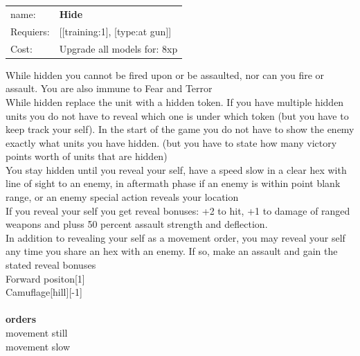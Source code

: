 \ \\
\ \\
\begin{tabular}{ll}
name: & {\bf Hide } \\
Requiers: & [[training:1], [type:at gun]] \\
Cost: & Upgrade all models for: 8xp \\
\end{tabular}

While hidden you cannot be fired upon or be assaulted, nor can you fire or assault. You are also immune to Fear and Terror\\ 
While hidden replace the unit with a hidden token. If you have multiple hidden units you do not have to reveal which one is under which token (but you have to keep track your self). In the start of the game you do not have to show the enemy exactly what units you have hidden. (but you have to state how many victory points worth of units that are hidden)\\ 
You stay hidden until you reveal your self, have a speed slow in a clear hex with line of sight to an enemy, in aftermath phase if an enemy is within point blank range, or an enemy special action reveals your location\\ 
If you reveal your self you get reveal bonuses: +2 to hit, +1 to damage of ranged weapons and pluss 50 percent assault strength and deflection.\\ 
In addition to revealing your self as a movement order, you may reveal your self any time you share an hex with an enemy. If so, make an assault and gain the stated reveal bonuses\\ 
Forward positon[1]\\ 
Camuflage[hill][-1]\\ 








\ \\ {\bf orders } \\
movement still \\
movement slow \\

\ \\
